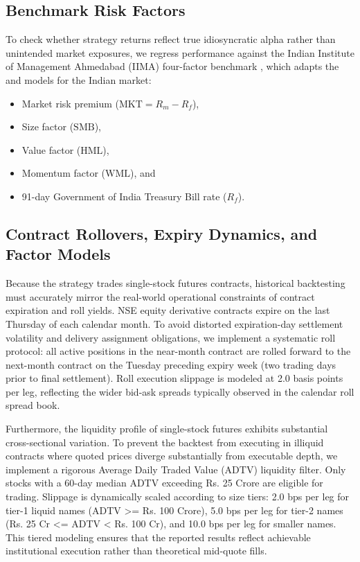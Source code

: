 \subsection{Benchmark Risk Factors}
To check whether strategy returns reflect true idiosyncratic alpha rather than unintended market exposures, we regress performance against the Indian Institute of Management Ahmedabad (IIMA) four-factor benchmark \citep{agarwalla2014four}, which adapts the \citet{fama1993common} and \citet{carhart1997persistence} models for the Indian market:
\begin{itemize}
    \item Market risk premium ($\text{MKT} = R_m - R_f$),
    \item Size factor ($\text{SMB}$),
    \item Value factor ($\text{HML}$),
    \item Momentum factor ($\text{WML}$), and
    \item 91-day Government of India Treasury Bill rate ($R_f$).
\end{itemize}


\subsection{Contract Rollovers, Expiry Dynamics, and Factor Models}
Because the strategy trades single-stock futures contracts, historical backtesting must accurately mirror the real-world operational constraints of contract expiration and roll yields. NSE equity derivative contracts expire on the last Thursday of each calendar month. To avoid distorted expiration-day settlement volatility and delivery assignment obligations, we implement a systematic roll protocol: all active positions in the near-month contract are rolled forward to the next-month contract on the Tuesday preceding expiry week (two trading days prior to final settlement). Roll execution slippage is modeled at 2.0 basis points per leg, reflecting the wider bid-ask spreads typically observed in the calendar roll spread book.

Furthermore, the liquidity profile of single-stock futures exhibits substantial cross-sectional variation. To prevent the backtest from executing in illiquid contracts where quoted prices diverge substantially from executable depth, we implement a rigorous Average Daily Traded Value (ADTV) liquidity filter. Only stocks with a 60-day median ADTV exceeding Rs. 25 Crore are eligible for trading. Slippage is dynamically scaled according to size tiers: 2.0 bps per leg for tier-1 liquid names (ADTV >= Rs. 100 Crore), 5.0 bps per leg for tier-2 names (Rs. 25 Cr <= ADTV < Rs. 100 Cr), and 10.0 bps per leg for smaller names. This tiered modeling ensures that the reported results reflect achievable institutional execution rather than theoretical mid-quote fills.

